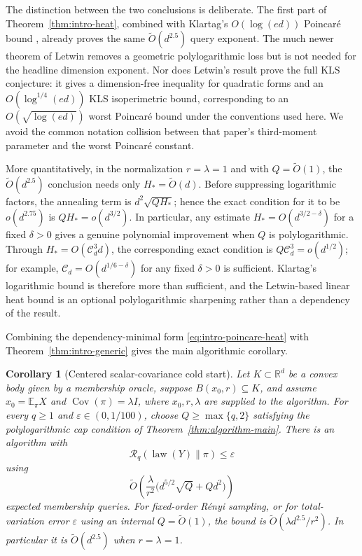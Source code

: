 \documentclass[11pt]{article}
\newtheorem{corollary}[theorem]{Corollary}
\theoremstyle{remark}
\newcommand{\R}{\mathbb R}
\newcommand{\E}{\mathbb E}
\newcommand{\1}{\bm 1}
\newcommand{\eps}{\varepsilon}
\newcommand{\Cov}{\operatorname{Cov}}
\newcommand{\law}{\operatorname{law}}
\begin{document}
The distinction between the two conclusions is deliberate.  The first
part of Theorem~\ref{thm:intro-heat}, combined with Klartag's
  $O(\log(ed))$ Poincar\'e bound \citep{Klartag23log}, already proves the
same $\widetilde O(d^{2.5})$ query exponent.  The much newer theorem of
Letwin \citep{Letwin26KLS} removes a geometric polylogarithmic loss but
is not needed for the headline dimension exponent.  Nor does Letwin's
result prove the full KLS conjecture: it gives a dimension-free
  inequality for quadratic forms and an $O(\log^{1/4}(ed))$ KLS
isoperimetric bound, corresponding to an
  $O(\sqrt{\log(ed)})$ worst Poincar\'e bound under the conventions used
here.  We avoid the common notation collision between that paper's
third-moment parameter and the worst Poincar\'e constant.

More quantitatively, in the normalization $r=\lambda=1$ and with
$Q=\widetilde O(1)$, the $\widetilde O(d^{2.5})$ conclusion needs only
$H_*=\widetilde O(d)$.  Before suppressing logarithmic factors, the
annealing term is $d^2\sqrt{QH_*}$; hence the exact condition for it to
be $o(d^{2.75})$ is $QH_*=o(d^{3/2})$.  In particular, any estimate
$H_*=O(d^{3/2-\delta})$ for a fixed $\delta>0$ gives a genuine
polynomial improvement when $Q$ is polylogarithmic.  Through
$H_*=O(\mathcal C_d^3d)$, the corresponding exact condition is
$Q\mathcal C_d^3=o(d^{1/2})$; for example,
$\mathcal C_d=O(d^{1/6-\delta})$ for any fixed $\delta>0$ is sufficient.
Klartag's logarithmic bound is therefore more than sufficient, and
the Letwin-based linear heat bound is an optional polylogarithmic sharpening
rather than a dependency of the result.

Combining the dependency-minimal form
\eqref{eq:intro-poincare-heat} with
Theorem~\ref{thm:intro-generic} gives the main algorithmic corollary.

\begin{corollary}[Centered scalar-covariance cold start]
\label{cor:intro-main}
Let $K\subset\R^d$ be a convex body given by a membership oracle,
suppose $B(x_0,r)\subseteq K$, and assume
$x_0=\E_\pi X$ and $\Cov(\pi)=\lambda I$, where $x_0,r,\lambda$ are
supplied to the algorithm.  For every $q\geq1$ and
$\eps\in(0,1/100)$, choose
$Q\geq\max\{q,2\}$ satisfying the polylogarithmic cap condition of
Theorem~\ref{thm:algorithm-main}.  There is an algorithm with
\[
  \mathcal R_q(\law(Y)\|\pi)\leq\eps
\]
using
\begin{equation}\label{eq:intro-main-bound}
  \widetilde O\!\left(
    \frac{\lambda}{r^2}
    \bigl(d^{5/2}\sqrt Q+Qd^2\bigr)
  \right)
\end{equation}
expected membership queries.  For fixed-order R\'enyi sampling, or for
total-variation error $\eps$ using an internal
$Q=\widetilde O(1)$, the bound is
$\widetilde O(\lambda d^{2.5}/r^2)$.  In particular it is
$\widetilde O(d^{2.5})$ when $r=\lambda=1$.
\end{corollary}
\end{document}
